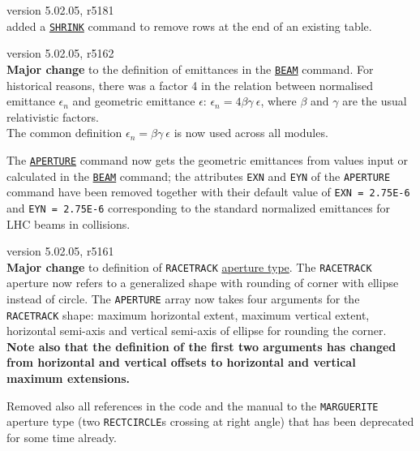 \begin{madlist}
   version 5.02.05, r5181\\
  added a \hyperref[sec:shrink]{\texttt{SHRINK}} command to remove 
  rows at the end of an existing table.

   version 5.02.05, r5162\\
  \textbf{Major change} to the definition of emittances in the 
  \hyperref[chap:beam]{\texttt{BEAM}} command. For historical reasons, 
  there was a factor 4 in the relation between normalised emittance 
  $\epsilon_n$ and geometric emittance $\epsilon$: 
  $\epsilon_n = 4 \beta \gamma \ \epsilon$, where $\beta$ and 
  $\gamma$ are the usual relativistic factors. \\
  The common definition $\epsilon_n = \beta \gamma \ \epsilon$ 
  is now used across all \madx modules.
  
  The \hyperref[sec:aperture]{\texttt{APERTURE}} command now gets the 
  geometric emittances from values input or calculated in the 
  \hyperref[chap:beam]{\texttt{BEAM}} command; the attributes
  \texttt{EXN} and \texttt{EYN} of the \texttt{APERTURE} command have
  been removed together with their default value of \texttt{EXN =
    2.75E-6} and \texttt{EYN = 2.75E-6} corresponding to the standard
  normalized emittances for LHC beams in collisions. 
  

   version 5.02.05, r5161\\
  \textbf{Major change} to definition of \texttt{RACETRACK} 
  \hyperref[sec:def-aper]{aperture type}. 
  The \texttt{RACETRACK} aperture now refers to a generalized shape 
  with rounding of corner with ellipse instead of circle. 
  The \texttt{APERTURE} array now takes four arguments for the 
  \texttt{RACETRACK} shape: maximum horizontal extent, maximum 
  vertical extent, horizontal semi-axis and vertical semi-axis 
  of ellipse for rounding the corner. \\
  \textbf{Note also that the definition of the first two arguments 
  has changed from horizontal and vertical offsets to horizontal 
  and vertical maximum extensions.}

  Removed also all references in the code and the manual to the 
  \texttt{MARGUERITE} aperture type (two \texttt{RECTCIRCLE}s 
  crossing at right angle) that has been deprecated for some 
  time already.



\end{madlist}
